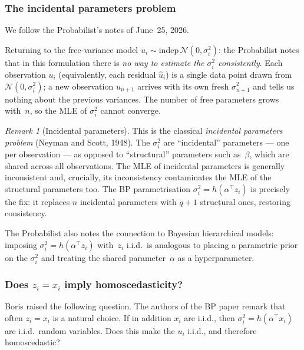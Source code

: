 \documentclass[a4paper,oneside,12pt]{extarticle}
\theoremstyle{plain}
\theoremstyle{definition}
\theoremstyle{remark}
\newtheorem{remark}[proposition]{Remark}
\begin{document}

\subsubsection*{The incidental parameters problem}

We follow the Probabilist's notes of June~25, 2026.

Returning to the free-variance model $u_i \sim \mathrm{indep}\,
\mathcal{N}(0, \sigma_i^2)$: the Probabilist notes that in this formulation
there is \emph{no way to estimate the $\sigma_i^2$ consistently}.
Each observation $u_i$ (equivalently, each residual $\hat u_i$) is
a single data point drawn from $\mathcal{N}(0, \sigma_i^2)$; a new
observation $u_{n+1}$ arrives with its own fresh $\sigma_{n+1}^2$
and tells us nothing about the previous variances.  The number of
free parameters grows with~$n$, so the MLE of $\sigma_i^2$ cannot
converge.

\begin{remark}[Incidental parameters]
This is the classical \emph{incidental parameters problem} (Neyman
and Scott, 1948).  The $\sigma_i^2$ are ``incidental'' parameters —
one per observation — as opposed to ``structural'' parameters such
as~$\beta$, which are shared across all observations.  The MLE of
incidental parameters is generally inconsistent and, crucially, its
inconsistency contaminates the MLE of the structural parameters too.
The BP parametrisation $\sigma_i^2 = h(\alpha^\top z_i)$ is
precisely the fix: it replaces $n$ incidental parameters with
$q + 1$ structural ones, restoring consistency.
\end{remark}

The Probabilist also notes the connection to Bayesian hierarchical models:
imposing $\sigma_i^2 = h(\alpha^\top z_i)$ with~$z_i$ i.i.d.\
is analogous to placing a parametric prior on the $\sigma_i^2$ and
treating the shared parameter~$\alpha$ as a hyperparameter.

\subsubsection*{Does $z_i = x_i$ imply homoscedasticity?}

Boris raised the following question.  The authors of the BP paper
remark that often $z_i = x_i$ is a natural choice.  If in addition
$x_i$ are i.i.d., then $\sigma_i^2 = h(\alpha^\top x_i)$ are
i.i.d.\ random variables.  Does this make the $u_i$ i.i.d., and
therefore homoscedastic?
\end{document}
